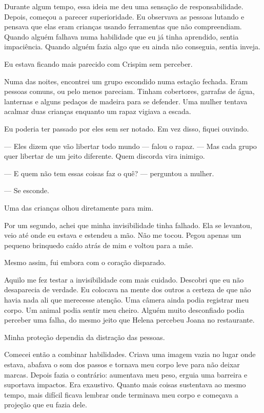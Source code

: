 Durante algum tempo, essa ideia me deu uma sensação de responsabilidade. Depois, começou a parecer superioridade. Eu observava as pessoas lutando e pensava que elas eram crianças usando ferramentas que não compreendiam. Quando alguém falhava numa habilidade que eu já tinha aprendido, sentia impaciência. Quando alguém fazia algo que eu ainda não conseguia, sentia inveja.

Eu estava ficando mais parecido com Crispim sem perceber.

Numa das noites, encontrei um grupo escondido numa estação fechada. Eram pessoas comuns, ou pelo menos pareciam. Tinham cobertores, garrafas de água, lanternas e alguns pedaços de madeira para se defender. Uma mulher tentava acalmar duas crianças enquanto um rapaz vigiava a escada.

Eu poderia ter passado por eles sem ser notado. Em vez disso, fiquei ouvindo.

— Eles dizem que vão libertar todo mundo — falou o rapaz. — Mas cada grupo quer libertar de um jeito diferente. Quem discorda vira inimigo.

— E quem não tem essas coisas faz o quê? — perguntou a mulher.

— Se esconde.

Uma das crianças olhou diretamente para mim.

Por um segundo, achei que minha invisibilidade tinha falhado. Ela se levantou, veio até onde eu estava e estendeu a mão. Não me tocou. Pegou apenas um pequeno brinquedo caído atrás de mim e voltou para a mãe.

Mesmo assim, fui embora com o coração disparado.

Aquilo me fez testar a invisibilidade com mais cuidado. Descobri que eu não desaparecia de verdade. Eu colocava na mente dos outros a certeza de que não havia nada ali que merecesse atenção. Uma câmera ainda podia registrar meu corpo. Um animal podia sentir meu cheiro. Alguém muito desconfiado podia perceber uma falha, do mesmo jeito que Helena percebeu Joana no restaurante.

Minha proteção dependia da distração das pessoas.

Comecei então a combinar habilidades. Criava uma imagem vazia no lugar onde estava, abafava o som dos passos e tornava meu corpo leve para não deixar marcas. Depois fazia o contrário: aumentava meu peso, erguia uma barreira e suportava impactos. Era exaustivo. Quanto mais coisas sustentava ao mesmo tempo, mais difícil ficava lembrar onde terminava meu corpo e começava a projeção que eu fazia dele.

